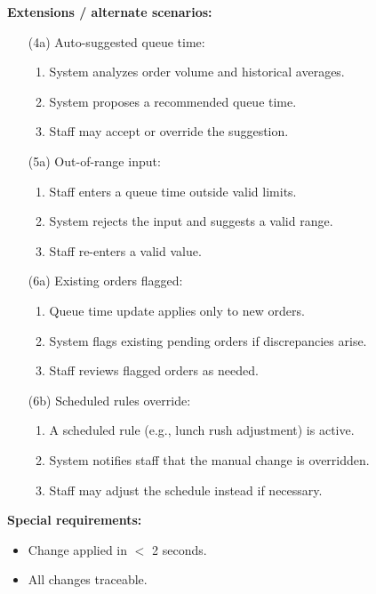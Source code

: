 \documentclass{article}
\begin{document}
\textbf{Extensions / alternate scenarios:}
\begin{itemize}
    \item[(4a)] Auto-suggested queue time:
    \begin{enumerate}
        \item System analyzes order volume and historical averages.
        \item System proposes a recommended queue time.
        \item Staff may accept or override the suggestion.
    \end{enumerate}

    \item[(5a)] Out-of-range input:
    \begin{enumerate}
        \item Staff enters a queue time outside valid limits.
        \item System rejects the input and suggests a valid range.
        \item Staff re-enters a valid value.
    \end{enumerate}

    \item[(6a)] Existing orders flagged:
    \begin{enumerate}
        \item Queue time update applies only to new orders.
        \item System flags existing pending orders if discrepancies arise.
        \item Staff reviews flagged orders as needed.
    \end{enumerate}

    \item[(6b)] Scheduled rules override:
    \begin{enumerate}
        \item A scheduled rule (e.g., lunch rush adjustment) is active.
        \item System notifies staff that the manual change is overridden.
        \item Staff may adjust the schedule instead if necessary.
    \end{enumerate}
\end{itemize}


\textbf{Special requirements:}
\begin{itemize}
    \item Change applied in $<$ 2 seconds.
    \item All changes traceable.
\end{itemize}
\end{document}
